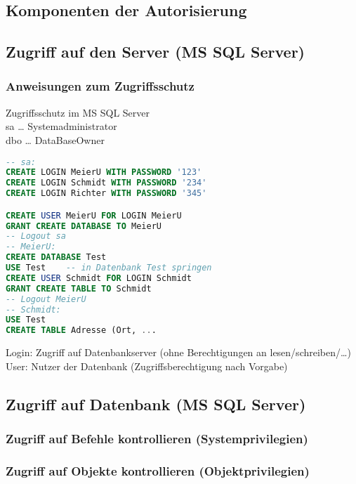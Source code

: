 \subsection{Komponenten der Autorisierung}

\subsection{Zugriff auf den Server (MS SQL Server)}
\subsubsection*{Anweisungen zum Zugriffsschutz}
Zugriffsschutz im MS SQL Server\\
sa … Systemadministrator\\
dbo … DataBaseOwner
\begin{lstlisting}[language=SQL]
-- sa:
CREATE LOGIN MeierU WITH PASSWORD '123'
CREATE LOGIN Schmidt WITH PASSWORD '234'
CREATE LOGIN Richter WITH PASSWORD '345'

CREATE USER MeierU FOR LOGIN MeierU
GRANT CREATE DATABASE TO MeierU
-- Logout sa
-- MeierU:
CREATE DATABASE Test
USE Test	-- in Datenbank Test springen
CREATE USER Schmidt FOR LOGIN Schmidt
GRANT CREATE TABLE TO Schmidt
-- Logout MeierU
-- Schmidt:
USE Test
CREATE TABLE Adresse (Ort, ...
\end{lstlisting}
Login: Zugriff auf Datenbankserver (ohne Berechtigungen an lesen/schreiben/…)\\
User: Nutzer der Datenbank (Zugriffsberechtigung nach Vorgabe)
\subsection{Zugriff auf Datenbank (MS SQL Server)}
\subsubsection{Zugriff auf Befehle kontrollieren (Systemprivilegien)}
\subsubsection{Zugriff auf Objekte kontrollieren (Objektprivilegien)}
